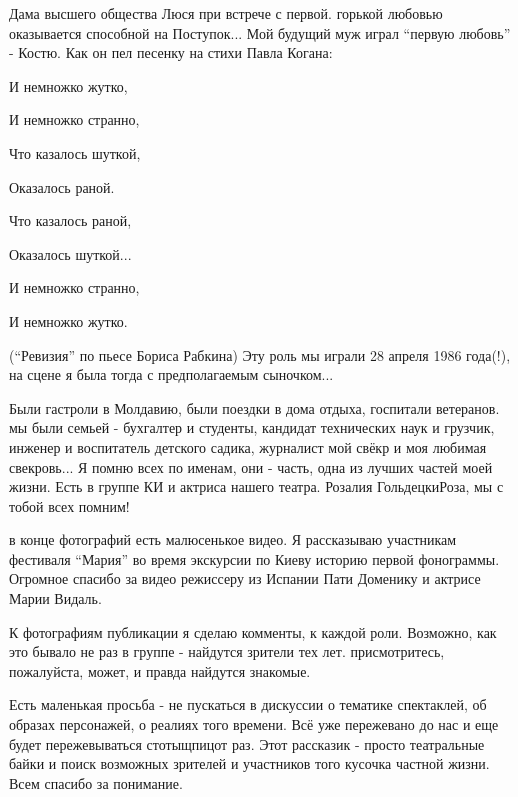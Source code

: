 Дама высшего общества  Люся при встрече с первой. горькой любовью оказывается
способной на Поступок... Мой будущий  муж играл \enquote{первую любовь} -
Костю.  Как он пел песенку на стихи Павла Когана:

И немножко жутко, 

И немножко странно, 

Что казалось шуткой, 

Оказалось раной. 

Что казалось раной, 

Оказалось шуткой... 

И немножко странно, 

И немножко жутко. 

(\enquote{Ревизия} по пьесе Бориса Рабкина) Эту роль мы играли 28 апреля 1986 года(!),
на сцене я была тогда с предполагаемым сыночком...

Были гастроли в Молдавию, были поездки в дома отдыха, госпитали ветеранов. мы
были семьей - бухгалтер и студенты, кандидат технических наук и грузчик,
инженер и воспитатель детского садика, журналист мой свёкр и моя любимая
свекровь... Я помню всех по именам, они - часть, одна из лучших частей моей
жизни. Есть в группе КИ  и актриса нашего театра.  Розалия ГольдецкиРоза, мы с
тобой всех помним! 

в конце фотографий есть малюсенькое видео. Я рассказываю участникам фестиваля
\enquote{Мария} во время экскурсии по Киеву историю первой фонограммы. Огромное спасибо
за видео режиссеру из Испании Пати Доменику  и актрисе Марии Видаль. 

К фотографиям публикации я сделаю комменты, к каждой роли. Возможно, как это
бывало не раз в группе - найдутся зрители тех лет. присмотритесь, пожалуйста,
может, и правда найдутся знакомые.

Есть маленькая просьба - не пускаться в дискуссии о тематике спектаклей, об
образах персонажей, о реалиях того времени. Всё уже пережевано до нас и еще
будет пережевываться стотыщпицот раз. Этот рассказик - просто театральные байки
и поиск возможных зрителей и участников того кусочка частной жизни. Всем
спасибо за понимание.
